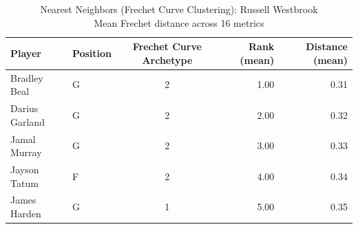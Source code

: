\begin{table}[t]
\caption*{
{\fontsize{20}{25} Nearest Neighbors (Frechet Curve Clustering): Russell Westbrook\fontsize{12}{15}\selectfont } \\ 
{\fontsize{14}{17}\selectfont  Mean Frechet distance across 16 metrics\fontsize{12}{15}\selectfont }
} 
\fontsize{12.0pt}{14.0pt}\selectfont
\begin{tabular*}{\linewidth}{@{\extracolsep{\fill}}llcrr}
\toprule
Player & Position & Frechet Curve Archetype & Rank (mean) & Distance (mean) \\ 
\midrule\addlinespace[2.5pt]
Bradley Beal & G & 2 & 1.00 & 0.31 \\ 
Darius Garland & G & 2 & 2.00 & 0.32 \\ 
Jamal Murray & G & 2 & 3.00 & 0.33 \\ 
Jayson Tatum & F & 2 & 4.00 & 0.34 \\ 
James Harden & G & 1 & 5.00 & 0.35 \\ 
\bottomrule
\end{tabular*}
\end{table}


